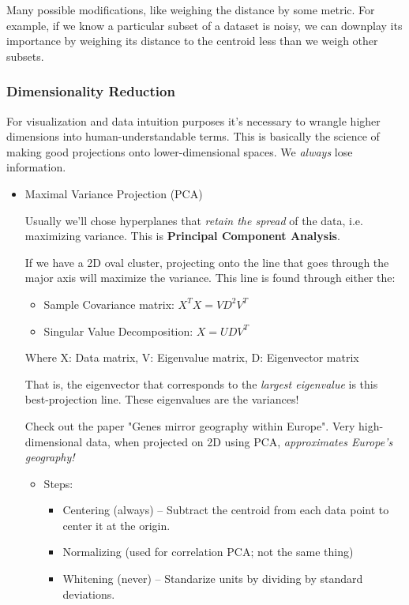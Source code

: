 \documentclass[11pt]{article}
\begin{document}
\begin{itemize}
\begin{itemize}
\begin{itemize}
Many possible modifications, like weighing the distance by some metric. For example, if we know a particular subset of a dataset is noisy, we can downplay its importance by weighing its distance to the centroid less than we weigh other subsets.
\end{itemize}
\end{itemize}



\subsubsection*{Dimensionality Reduction}
\label{sec-2-2-2}

For visualization and data intuition purposes it's necessary to wrangle higher dimensions into human-understandable terms. This is basically the science of making good projections onto lower-dimensional spaces. We \emph{always} lose information.


\begin{itemize}
\item Maximal Variance Projection (PCA)
\label{sec-2-2-2-1}

Usually we'll chose hyperplanes that \emph{retain the spread} of the data, i.e. maximizing variance. This is \textbf{Principal Component Analysis}.

If we have a 2D oval cluster, projecting onto the line that goes through the major axis will maximize the variance. This line is found through either the:
\begin{itemize}
\item Sample Covariance matrix: $X^TX=VD^2V^T$
\item Singular Value Decomposition: $X=UDV^T$
\end{itemize}
Where X: Data matrix, V: Eigenvalue matrix, D: Eigenvector matrix

That is, the eigenvector that corresponds to the \emph{largest eigenvalue} is this best-projection line. These eigenvalues are the variances!

Check out the paper "Genes mirror geography within Europe". Very high-dimensional data, when projected on 2D using PCA, \emph{approximates Europe's geography!}

\begin{itemize}
\item Steps:
\label{sec-2-2-2-1-1}

\begin{itemize}
\item Centering (always) -- Subtract the centroid from each data point to center it at the origin.
\item Normalizing (used for correlation PCA; not the same thing)
\item Whitening (never) --  Standarize units by dividing by standard deviations.
\end{itemize}



\end{itemize}
\end{itemize}
\end{itemize}
\end{document}
